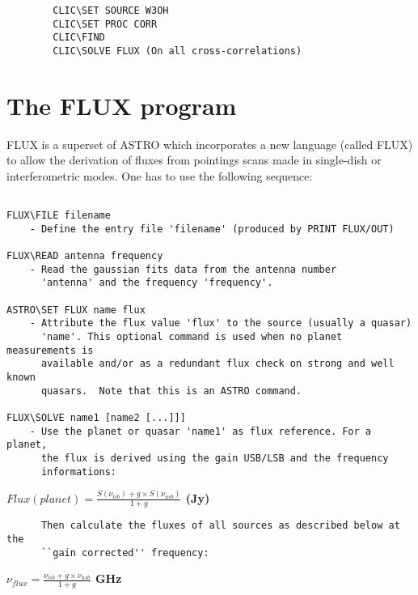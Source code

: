 \documentclass[11pt]{article}
\begin{document}
\begin{verbatim}
        CLIC\SET SOURCE W3OH
        CLIC\SET PROC CORR
        CLIC\FIND
        CLIC\SOLVE FLUX (On all cross-correlations) 
\end{verbatim} 


\section{The FLUX program}

FLUX is a superset of ASTRO which incorporates a new language (called FLUX)
to allow the derivation of fluxes from pointings scans made in single-dish
or interferometric modes. One has to use the following sequence:
 
\begin{verbatim}

FLUX\FILE filename
    - Define the entry file 'filename' (produced by PRINT FLUX/OUT)     

FLUX\READ antenna frequency 
    - Read the gaussian fits data from the antenna number 
      'antenna' and the frequency 'frequency'. 

ASTRO\SET FLUX name flux  
    - Attribute the flux value 'flux' to the source (usually a quasar)
      'name'. This optional command is used when no planet measurements is 
      available and/or as a redundant flux check on strong and well known 
      quasars.  Note that this is an ASTRO command.

FLUX\SOLVE name1 [name2 [...]]] 
    - Use the planet or quasar 'name1' as flux reference. For a planet,
      the flux is derived using the gain USB/LSB and the frequency 
      informations:
\end{verbatim}
\centerline{\bf $Flux(planet) = \frac{S(\nu_{lsb})+ g\times
    S(\nu_{usb})}{1+g}$ (Jy)}
\begin{verbatim}
      Then calculate the fluxes of all sources as described below at the 
      ``gain corrected'' frequency: 
\end{verbatim}
\centerline{\bf $\nu_{flux} = \frac{\nu_{lsb}+ g\times \nu_{usb}}{1+g}$
  GHz}
\end{document}

